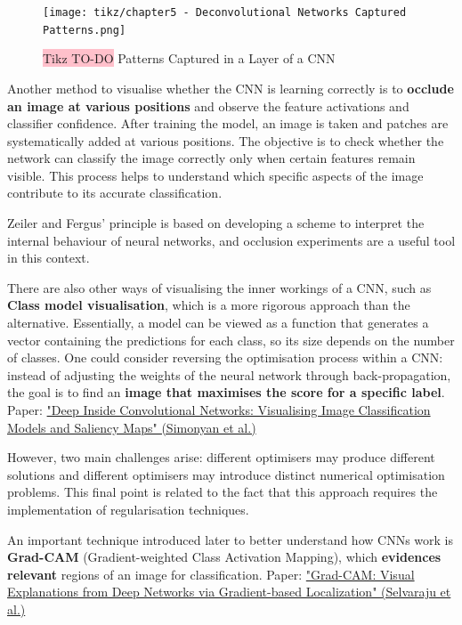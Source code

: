 \begin{figure}[!htbp]
    \centering
    \texttt{[image: tikz/chapter5 - Deconvolutional Networks Captured Patterns.png]}
    \caption{{\color{red}\colorbox{pink}{Tikz TO-DO}} Patterns Captured in a Layer of a CNN}
\end{figure}

Another method to visualise whether the CNN is learning correctly is to \textbf{occlude an image at various positions} and observe the feature activations and classifier confidence. After training the model, an image is taken and patches are systematically added at various positions. The objective is to check whether the network can classify the image correctly only when certain features remain visible. This process helps to understand which specific aspects of the image contribute to its accurate classification.

Zeiler and Fergus' principle is based on developing a scheme to interpret the internal behaviour of neural networks, and occlusion experiments are a useful tool in this context.

There are also other ways of visualising the inner workings of a CNN, such as \textbf{Class model visualisation}, which is a more rigorous approach than the alternative. Essentially, a model can be viewed as a function that generates a vector containing the predictions for each class, so its size depends on the number of classes. One could consider reversing the optimisation process within a CNN: instead of adjusting the weights of the neural network through back-propagation, the goal is to find an \textbf{image that maximises the score for a specific label}. 
Paper: \href{https://arxiv.org/pdf/1312.6034}{"Deep Inside Convolutional Networks: Visualising
Image Classification Models and Saliency Maps" (Simonyan et al.)}

However, two main challenges arise: different optimisers may produce different solutions and different optimisers may introduce distinct numerical optimisation problems. This final point is related to the fact that this approach requires the implementation of regularisation techniques.

An important technique introduced later to better understand how CNNs work is \textbf{Grad-CAM} (Gradient-weighted Class Activation Mapping), which \textbf{evidences relevant} regions of an image for classification.
Paper: \href{https://arxiv.org/pdf/1610.02391}{"Grad-CAM: Visual Explanations from Deep Networks via Gradient-based Localization" (Selvaraju et al.)}

